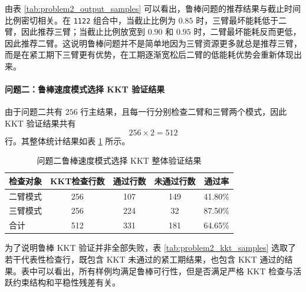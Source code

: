 由表 \ref{tab:problem2_output_samples} 可以看出，鲁棒问题的推荐结果与截止时间比例密切相关。在 \texttt{1122} 组合中，当截止比例为 $0.85$ 时，三臂最坏能耗低于二臂，因此推荐三臂；当截止比例放宽到 $0.90$ 和 $0.95$ 时，二臂最坏能耗反而更低，因此推荐二臂。这说明鲁棒问题并不是简单地因为三臂资源更多就总是推荐三臂，而是在紧工期下三臂更有优势，在工期逐渐宽松后二臂的低能耗优势会重新体现出来。

\paragraph{问题二：鲁棒速度模式选择 KKT 验证结果}

由于问题二共有 $256$ 行主结果，且每一行分别检查二臂和三臂两个模式，因此 KKT 验证结果共有
\[
256\times 2=512
\]
行。其整体统计结果如表 \ref{tab:problem2_kkt_overall} 所示。

\begin{table}[H]
	\centering
	\caption{问题二鲁棒速度模式选择 KKT 整体验证结果}
	\label{tab:problem2_kkt_overall}
	\footnotesize
	\begin{tabular}{lcccc}
		\hline
		检查对象 & KKT检查行数 & 通过行数 & 未通过行数 & 通过率 \\
		\hline
		二臂模式 & 256 & 107 & 149 & 41.80\% \\
		三臂模式 & 256 & 224 & 32 & 87.50\% \\
		合计 & 512 & 331 & 181 & 64.65\% \\
		\hline
	\end{tabular}
\end{table}

为了说明鲁棒 KKT 验证并非全部失败，表 \ref{tab:problem2_kkt_samples} 选取了若干代表性检查行，既包含 KKT 未通过的紧工期结果，也包含 KKT 通过的结果。表中可以看出，所有样例均满足鲁棒可行性，但是否满足严格 KKT 检查与活跃约束结构和平稳性残差有关。

